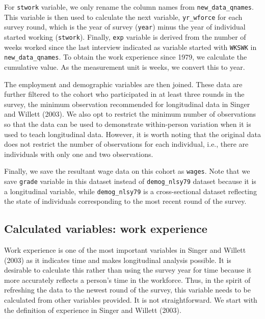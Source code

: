 \documentclass[12pt]{article}
\begin{document}
For \texttt{stwork} variable, we only rename the column names from \texttt{new\_data\_qnames}. This variable is then used to calculate the next variable, \texttt{yr\_wforce} for each survey round, which is the year of survey (\texttt{year}) minus the year of individual started working (\texttt{stwork}). Finally, \texttt{exp} variable is derived from the number of weeks worked since the last interview indicated as variable started with \texttt{WKSWK} in \texttt{new\_data\_qnames}. To obtain the work experience since 1979, we calculate the cumulative value. As the measurement unit is weeks, we convert this to year.

The employment and demographic variables are then joined. These data are further filtered to the cohort who participated in at least three rounds in the survey, the minimum observation recommended for longitudinal data in Singer and Willett (2003). We also opt to restrict the minimum number of observations so that the data can be used to demonstrate within-person variation when it is used to teach longitudinal data. However, it is worth noting that the original data does not restrict the number of observations for each individual, i.e., there are individuals with only one and two observations.

Finally, we save the resultant wage data on this cohort as \texttt{wages}. Note that we save \texttt{grade} variable in this dataset instead of \texttt{demog\_nlsy79} dataset because it is a longitudinal variable, while \texttt{demog\_nlsy79} is a cross-sectional dataset reflecting the state of individuals corresponding to the most recent round of the survey.

\hypertarget{calculated-variables-work-experience}{%
\subsection{Calculated variables: work experience}\label{calculated-variables-work-experience}}

Work experience is one of the most important variables in Singer and Willett (2003) as it indicates time and makes longitudinal analysis possible. It is desirable to calculate this rather than using the survey year for time because it more accurately reflects a person's time in the workforce. Thus, in the spirit of refreshing the data to the newest round of the survey, this variable needs to be calculated from other variables provided. It is not straightforward. We start with the definition of experience in Singer and Willett (2003).
\end{document}
